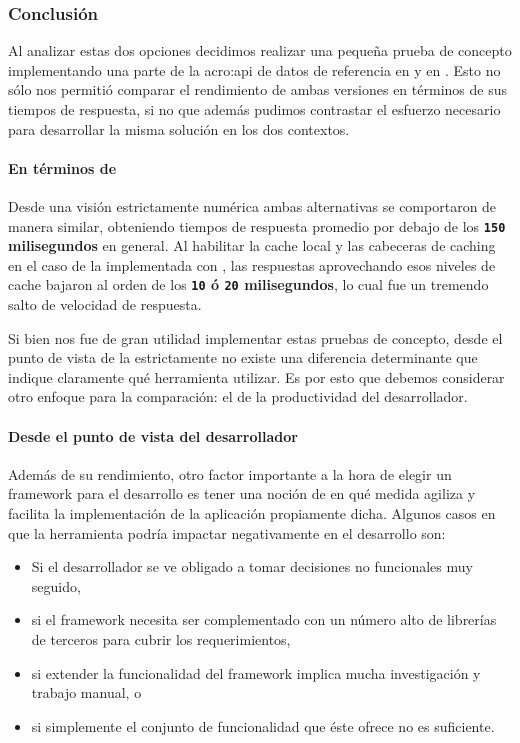 \subsubsection{Conclusión}
\label{soa:tecnologias:apps:conclusion}

Al analizar estas dos opciones decidimos realizar una pequeña prueba de concepto implementando una parte de la \gls{acro:api} de datos de referencia en  y en . Esto no sólo nos permitió comparar el rendimiento de ambas versiones en términos de sus tiempos de respuesta, si no que además pudimos contrastar el esfuerzo necesario para desarrollar la misma solución en los dos contextos.

\paragraph{En términos de }

Desde una visión estrictamente numérica ambas alternativas se comportaron de manera similar, obteniendo tiempos de respuesta promedio por debajo de los \textbf{\texttt{150} milisegundos} en general. Al habilitar la cache local y las cabeceras de caching en el caso de la implementada con , las respuestas aprovechando esos niveles de cache bajaron al orden de los \textbf{\texttt{10} ó \texttt{20} milisegundos}, lo cual fue un tremendo salto de velocidad de respuesta.

Si bien nos fue de gran utilidad implementar estas pruebas de concepto, desde el punto de vista de la  estrictamente no existe una diferencia determinante que indique claramente qué herramienta utilizar. Es por esto que debemos considerar otro enfoque para la comparación: el de la productividad del desarrollador.

\paragraph{Desde el punto de vista del desarrollador}

Además de su rendimiento, otro factor importante a la hora de elegir un framework para el desarrollo es tener una noción de en qué medida agiliza y facilita la implementación de la aplicación propiamente dicha. Algunos casos en que la herramienta podría impactar negativamente en el desarrollo son:

\begin{itemize}
  \item Si el desarrollador se ve obligado a tomar decisiones no funcionales muy seguido,
  \item si el framework necesita ser complementado con un número alto de librerías de terceros para cubrir los requerimientos,
  \item si extender la funcionalidad del framework implica mucha investigación y trabajo manual, o
  \item si simplemente el conjunto de funcionalidad que éste ofrece no es suficiente.
\end{itemize}

